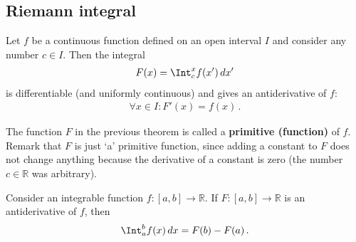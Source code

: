 \subsection{Riemann integral}


    \begin{theorem}\label{calculus:first_fundamental_theorem}
        Let $f$ be a continuous function defined on an open interval $I$ and consider any number $c\in I$. Then the integral
        \begin{gather}
            F(x) = \Int_c^xf(x')\,dx'
        \end{gather}
        is differentiable (and uniformly continuous) and gives an antiderivative of $f$:
        \begin{gather}
            \forall x\in I:F'(x)=f(x)\,.
        \end{gather}
    \end{theorem}

    \begin{remark}
        The function $F$ in the previous theorem is called a \textbf{primitive (function)} of $f$. Remark that $F$ is just `a' primitive function, since adding a constant to $F$ does not change anything because the derivative of a constant is zero (the number $c\in\mathbb{R}$ was arbitrary).
    \end{remark}

    \begin{theorem}\label{calculus:second_fundamental_theorem}
        Consider an integrable function $f:[a,b]\rightarrow\mathbb{R}$. If $F:[a,b]\rightarrow\mathbb{R}$ is an antiderivative of $f$, then
        \begin{gather}
            \Int_a^bf(x)\,dx = F(b) - F(a)\,.
        \end{gather}
    \end{theorem}

